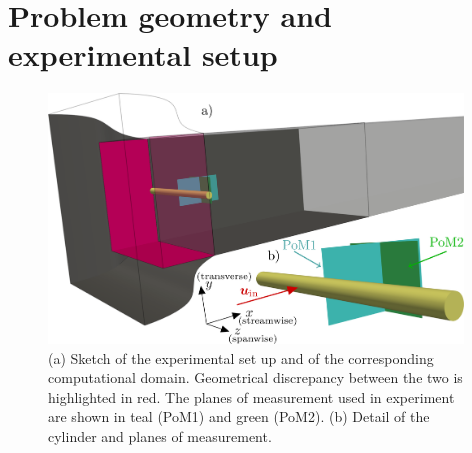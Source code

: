\section{Problem geometry and experimental setup}
\label{sec:experiments}

\begin{figure}[htbp]
    \centering
    \includegraphics[width=0.98\textwidth]{02_images/00_export/figure1.png}
    \caption{(a) Sketch of the experimental set up and of the corresponding computational domain. Geometrical discrepancy between the two is highlighted in red. The planes of measurement used in experiment are shown in teal (PoM1) and green (PoM2). (b) Detail of the cylinder and planes of measurement.}
    \label{fig:geom}
\end{figure}
